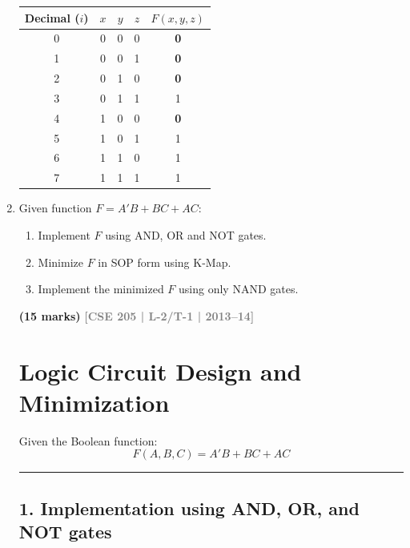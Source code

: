 \documentclass[12pt,a3paper]{article}
\newcommand{\yr}[1]{\hfill\textcolor{gray}{\small\textbf{[#1]}}}
\newcommand{\mk}[1]{\textcolor{orange!70!black}{\small\textbf{(#1 marks)}}}
\begin{document}
\begin{enumerate}
\begin{tcolorbox}[enhanced,breakable,ansbox,colback=cA!4,colframe=cA,boxrule=0.8pt,arc=5pt,title={\textbf{Answer}},fonttitle=\bfseries\color{white},colbacktitle=cA]
\begin{center}
\renewcommand{\arraystretch}{1.2}
\begin{tabular}{ccc|cc}
    \toprule
    \textbf{Decimal ($i$)} & \textbf{$x$} & \textbf{$y$} & \textbf{$z$} & \textbf{$F(x,y,z)$} \\
    \midrule
    0 & 0 & 0 & 0 & \textcolor{cA}{\textbf{0}} \\
    1 & 0 & 0 & 1 & \textcolor{cA}{\textbf{0}} \\
    2 & 0 & 1 & 0 & \textcolor{cA}{\textbf{0}} \\
    3 & 0 & 1 & 1 & 1 \\
    4 & 1 & 0 & 0 & \textcolor{cA}{\textbf{0}} \\
    5 & 1 & 0 & 1 & 1 \\
    6 & 1 & 1 & 0 & 1 \\
    7 & 1 & 1 & 1 & 1 \\
    \bottomrule
\end{tabular}
\end{center}

\end{tcolorbox}

\item Given function $F = A'B + BC + AC$:
\begin{enumerate}
  \item Implement $F$ using AND, OR and NOT gates.
  \item Minimize $F$ in SOP form using K-Map.
  \item Implement the minimized $F$ using only NAND gates.

\end{enumerate}
\mk{15} \yr{CSE 205 | L-2/T-1 | 2013--14}

\begin{tcolorbox}[enhanced,breakable,ansbox,colback=cA!4,colframe=cA,boxrule=0.8pt,arc=5pt,title={\textbf{Answer}},fonttitle=\bfseries\color{white},colbacktitle=cA]

\section*{Logic Circuit Design and Minimization}

Given the Boolean function:
\[ F(A, B, C) = A'B + BC + AC \]

\vspace{0.3cm}
\hrule
\vspace{0.3cm}

\subsection*{1. Implementation using AND, OR, and NOT gates}


\end{tcolorbox}
\end{enumerate}
\end{document}
